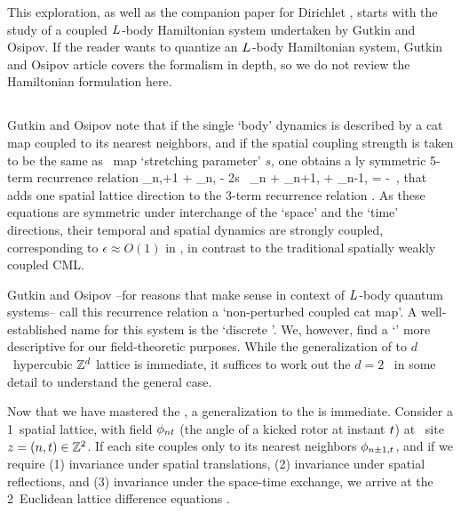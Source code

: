 This exploration, as well as the companion paper for
Dirichlet \bcs, starts with the study of a coupled ${L_{}}$-body
Hamiltonian system undertaken by Gutkin and Osipov. If the
reader wants to quantize an ${L_{}}$-body Hamiltonian system, Gutkin and Osipov
article covers the formalism in depth, so we do not review the
Hamiltonian formulation here.

\subsection{\catLatt}
\label{s:catLatt}

Gutkin and Osipov note that if the single `body' dynamics is described
by a cat map coupled to its nearest neighbors, and if the spatial
coupling strength is taken to be the same as \templatt\ map `stretching
parameter' ${s}$, one obtains a {\spt}ly symmetric 5-term recurrence
relation %
\beq
       \ssp_{n,\zeit+1} + \ssp_{n,}
- 2{s} \, \ssp_{n\zeit}
     + \ssp_{n+1,\zeit} + \ssp_{n-1, \zeit}
     = -
\,,
that adds one spatial lattice direction to  the {\templatt} 3-term
recurrence relation . As these equations are
symmetric under interchange of the `space' and the `time' directions,
their temporal and spatial dynamics are strongly coupled, corresponding to $\epsilon
\approx O(1)$ in , in contrast to the traditional
spatially weakly coupled CML.

Gutkin and Osipov --for reasons that make sense in context of ${L_{}}$-body
quantum systems-- call this recurrence relation a `non-perturbed coupled
cat map'. A well-established name for this system is
the `discrete {\sPe}'. We, however, find a `\catlatt' more descriptive
for our field-theoretic purposes.
While the generalization of  to $d$\dmn\ hypercubic
$\mathbb{Z}^d$ lattice is immediate, it suffices to work out the $d=2$
\catlatt\ in some detail to understand the general case.

Now that we have mastered the {\em \templatt} , a
generalization to the {\em \catlatt}  is
immediate. Consider a 1\dmn\ spatial lattice, with field $\phi_{nt}$
(the angle of a kicked rotor  at instant $t$) at
\spt\ site $z=(n,t)\in\mathbb{Z}^2$. If each site couples only to its
nearest neighbors $\phi_{n\pm1,t}$, and if we require
(1) invariance under spatial translations,
(2) invariance under spatial reflections, and
(3) invariance under the space-time exchange,
we arrive at the 2\dmn\ Euclidean lattice difference equations
.

